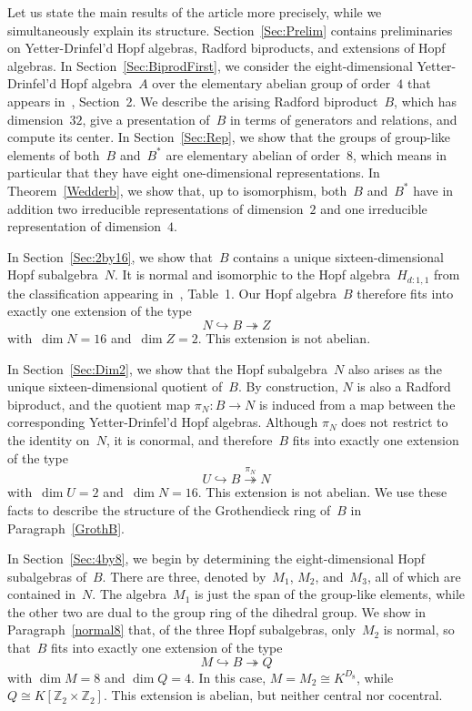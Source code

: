 \documentclass{article}
\numberwithin{equation}{section}
\theoremstyle{definition}
\theoremstyle{break}
\newcommand{\dm}{\operatorname{dim}}
\newcommand{\1}{{(1)}}
\newcommand{\2}{{(2)}}
\newcommand{\3}{{(3)}}
\newcommand{\Z}{{\mathbb Z}}
\begin{document}
Let us state the main results of the article more precisely, while we simultaneously explain its structure. Section~\ref{Sec:Prelim} contains preliminaries on Yetter-Drinfel'd Hopf algebras, Radford biproducts, and extensions of Hopf algebras. In Section~\ref{Sec:BiprodFirst}, we consider the eight-dimensional Yetter-Drinfel'd Hopf algebra~$A$ over the elementary abelian group of order~$4$ that appears in~\cite{KaSo2}, Section~2. We describe the arising Radford biproduct~$B$, which has dimension~$32$, give a presentation of~$B$ in terms of generators and relations, and compute its center. In Section~\ref{Sec:Rep}, we show that the groups of group-like elements of both~$B$ and~$B^*$ are elementary abelian of order~$8$, which means in particular that they have eight one-dimensional representations. In Theorem~\ref{Wedderb}, we show that, up to isomorphism, both~$B$ and~$B^*$ have in addition two irreducible representations of dimension~$2$ and one irreducible representation of dimension~$4$.

In Section~\ref{Sec:2by16}, we show that~$B$ contains a unique sixteen-dimensional Hopf subalgebra~$N$. It is normal and isomorphic to the Hopf algebra~$H_{d:1,1}$ from the classification appearing in~\cite{Ka}, Table~1. Our Hopf algebra~$B$ therefore fits into exactly one extension of the type
\[N \hookrightarrow B \twoheadrightarrow Z\]
with~$\dm N = 16$ and~$\dm Z = 2$. This extension is not abelian.

In Section~\ref{Sec:Dim2}, we show that the Hopf subalgebra~$N$ also arises as the unique sixteen-dimensional quotient of~$B$. By construction, $N$ is also a Radford biproduct, and the quotient map \mbox{$\pi_N \colon B \to N$} is induced from a map between the corresponding Yetter-Drinfel'd Hopf algebras. Although $\pi_N$ does not restrict to the identity on~$N$, it is conormal, and therefore~$B$ fits into exactly one extension of the type
\[U \hookrightarrow B \overset{\pi_N}{\twoheadrightarrow} N\]
with~$\dm U = 2$ and~$\dm N = 16$. This extension is not abelian. We use these facts to describe the structure of the Grothendieck ring of~$B$ in Paragraph~\ref{GrothB}.

In Section~\ref{Sec:4by8}, we begin by determining the eight-dimensional Hopf subalgebras of~$B$. There are three, denoted by~$M_1$, $M_2$, and~$M_3$, all of which are contained in~$N$. The algebra~$M_1$ is just the span of the group-like elements, while the other two are dual to the group ring of the dihedral group. We show in Paragraph~\ref{normal8} that, of the three Hopf subalgebras, only~$M_2$ is normal, so that~$B$ fits into exactly one extension of the type
\[M \hookrightarrow B \twoheadrightarrow Q\]
with $\dm M = 8$ and $\dm Q = 4$. In this case, $M = M_ 2 \cong K^{D_8}$,
while \mbox{$Q \cong K[\Z_2 \times \Z_2]$}. This extension is abelian, but neither central nor cocentral.
\end{document}
